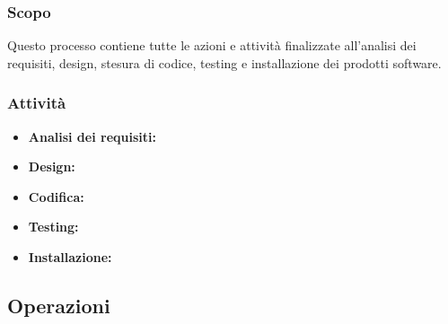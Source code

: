 \subsubsection{Scopo} Questo processo contiene tutte le azioni e attività finalizzate all'analisi dei requisiti, design, stesura di codice, testing e installazione dei prodotti software. 
\subsubsection{Attività}
\begin{itemize}
    \item \textbf{Analisi dei requisiti:} 
    \item \textbf{Design:} 
    \item \textbf{Codifica:} 
    \item \textbf{Testing:} 
    \item \textbf{Installazione:} 
\end{itemize}

\subsection{Operazioni}


